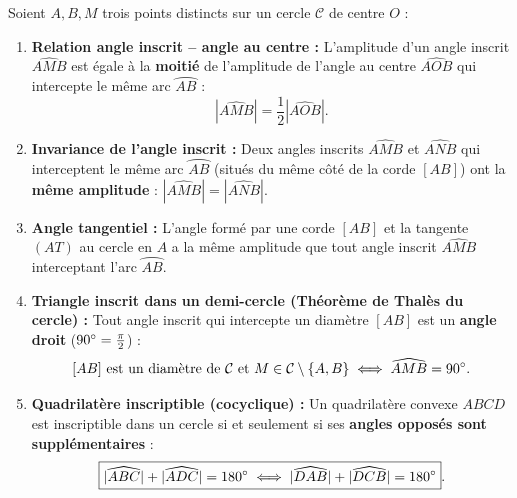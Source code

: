 \begin{theoreme}
Soient $A, B, M$ trois points distincts sur un cercle $\mathcal{C}$ de centre $O$ :
\begin{enumerate}
    \item \textbf{Relation angle inscrit -- angle au centre :} L'amplitude d'un angle inscrit $\widehat{AMB}$ est égale à la \textbf{moitié} de l'amplitude de l'angle au centre $\widehat{AOB}$ qui intercepte le même arc $\wideparen{AB}$ :
    \[
        \boxed{|\widehat{AMB}| = \frac{1}{2}|\widehat{AOB}|}.
    \]
    \item \textbf{Invariance de l'angle inscrit :} Deux angles inscrits $\widehat{AMB}$ et $\widehat{ANB}$ qui interceptent le même arc $\wideparen{AB}$ (situés du même côté de la corde $[AB]$) ont la \textbf{même amplitude} : $|\widehat{AMB}| = |\widehat{ANB}|$.
    \item \textbf{Angle tangentiel :} L'angle formé par une corde $[AB]$ et la tangente $(AT)$ au cercle en $A$ a la même amplitude que tout angle inscrit $\widehat{AMB}$ interceptant l'arc $\wideparen{AB}$.
    \item \textbf{Triangle inscrit dans un demi-cercle (Théorème de Thalès du cercle) :} Tout angle inscrit qui intercepte un diamètre $[AB]$ est un \textbf{angle droit} ($90\degree = \frac{\pi}{2}$) :
    \[
        [AB] \text{ est un diamètre de } \mathcal{C} \text{ et } M \in \mathcal{C} \setminus \{A,B\} \iff \widehat{AMB} = 90\degree.
    \]
    \item \textbf{Quadrilatère inscriptible (cocyclique) :} Un quadrilatère convexe $ABCD$ est inscriptible dans un cercle si et seulement si ses \textbf{angles opposés sont supplémentaires} :
    \[
        \boxed{|\widehat{ABC}| + |\widehat{ADC}| = 180\degree \iff |\widehat{DAB}| + |\widehat{DCB}| = 180\degree}.
    \]
\end{enumerate}
\end{theoreme}


